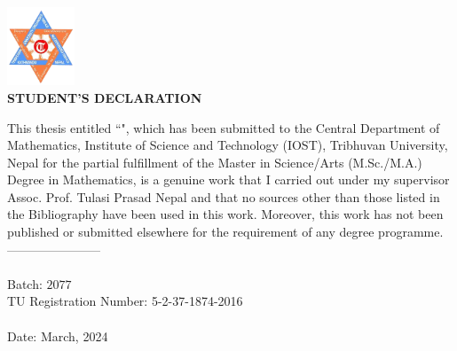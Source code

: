 

\begin{center}
  \includegraphics[width=0.15\textwidth]{pictures/tulogo.png}\\[1.5cm]

    {\Large{\bfseries{STUDENT'S DECLARATION}}}\\[.5cm]

  \end{center}


This thesis entitled ``\textbf{\thetitle}", which has been submitted to the Central Department of Mathematics, Institute of Science and Technology (IOST), Tribhuvan University, Nepal for the partial fulfillment of the Master in Science/Arts (M.Sc./M.A.) Degree  in Mathematics, is a genuine work that I carried out under my supervisor {\color{red} Assoc. Prof. Tulasi Prasad Nepal} and that no sources other than those listed in the Bibliography have been used in this work. Moreover, this work has not been published or submitted elsewhere for the requirement of any degree programme.
\\[1.5cm]
-----------------------\\
\theauthor\\
Batch: $2077$ \\
TU Registration Number: 5-2-37-1874-2016\\ \\
Date: March, 2024

\clearpage